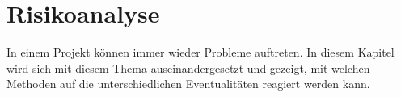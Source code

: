 \section{Risikoanalyse}
In einem Projekt können immer wieder Probleme auftreten. In diesem Kapitel wird sich mit diesem Thema auseinandergesetzt und gezeigt, mit welchen Methoden auf die unterschiedlichen Eventualitäten reagiert werden kann.\\